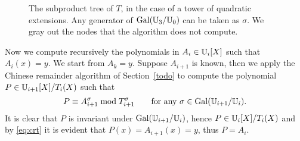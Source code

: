 \begin{figure}[tb]
  \centering
  
  \hfill
  
  \caption{The subproduct tree of $T$, in the case of a tower of
    quadratic extensions. Any generator of $\operatorname{Gal}(\mathbb{U}_3/\mathbb{U}_0)$ can be
    taken as $\sigma$. We gray out the nodes that the algorithm does
    not compute.}
  \label{fig:tree}
\end{figure}



Now we compute recursively the polynomials in $A_i\in\mathbb{U}_i[X]$ such
that $A_i(x)=y$. We start from $A_k=y$. Suppose $A_{i+1}$ is known,
then we apply the Chinese remainder algorithm of Section~\ref{todo}
to compute the polynomial $P\in\mathbb{U}_{i+1}[X]/T_i(X)$ such that
\begin{equation}
  \label{eq:crt}
  P \equiv A_{i+1}^\sigma \bmod T_{i+1}^\sigma
  \qquad\text{for any $\sigma\in\operatorname{Gal}(\mathbb{U}_{i+1}/\mathbb{U}_i)$.}
\end{equation}
It is clear that $P$ is invariant under $\operatorname{Gal}(\mathbb{U}_{i+1}/\mathbb{U}_i)$, hence
$P\in\mathbb{U}_i[X]/T_i(X)$ and by \eqref{eq:crt} it is evident that
$P(x)=A_{i+1}(x)=y$, thus $P=A_i$.

